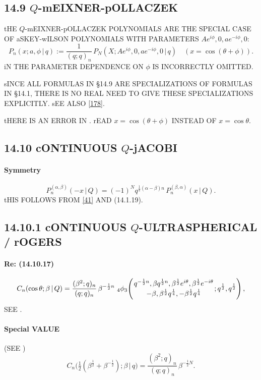 \documentclass[twoside,11pt]{article}
\newcommand\al\alpha
\newcommand\be\beta
\newcommand\tha\theta
\newcommand\half{\frac12}
\newcommand\thalf{\tfrac12}
\newcommand{\qhyp}[5]{\,\mbox{}_{#1}\phi_{#2}\!\left( 
  \genfrac{}{}{0pt}{}{#3}{#4};#5\right)}
\begin{document}
\subsection*{14.9 $Q$-mEIXNER-pOLLACZEK} 
\label{sec14.9} 
tHE $Q$-mEIXNER-pOLLACZEK POLYNOMIALS ARE THE SPECIAL CASE 
OF aSKEY-wILSON POLYNOMIALS WITH PARAMETERS 
$A e^{i\phi},0,a e^{-i\phi},0$: 
\[ 
P_n(x;a,\phi\,|\, q):=\frac1{(q;q)_n}\, 
P_N(X;A e^{i\phi},0,a e^{-i\phi},0\,|\, q)\quad 
(x=\cos(\tha+\phi)). 
\] 
iN  THE PARAMETER DEPENDENCE ON $\phi$ IS 
INCORRECTLY OMITTED. 
 
sINCE ALL FORMULAS IN \S14.9 ARE SPECIALIZATIONS OF FORMULAS IN \S14.1, 
THERE IS NO REAL NEED TO GIVE THESE SPECIALIZATIONS EXPLICITLY. 
sEE ALSO \eqref{178}. 
 
tHERE IS AN ERROR IN . 
rEAD $x=\cos(\tha+\phi)$ INSTEAD OF $x=\cos\tha$. 
% 
\subsection*{14.10 cONTINUOUS $Q$-jACOBI} 
\label{sec14.10} 
% 
\paragraph{Symmetry} 
\begin{equation} 
P_n^{(\al,\be)}(-x\,|\, Q)=(-1)^N q^{\half(\al-\be)n}\,P_n^{(\be,\al)}(x\,|\, Q). 
\label{110} 
\end{equation} 
tHIS FOLLOWS FROM \eqref{41} AND (14.1.19). 
% 
\subsection*{14.10.1 cONTINUOUS $Q$-ULTRASPHERICAL / rOGERS} 
\label{sec14.10.1} 
\paragraph{Re: (14.10.17)} 
\begin{equation} 
C_n(\cos\tha;\be\,|\, Q)= 
\frac{(\be^2;q)_n}{(q;q)_n}\,\be^{-\half n}\, 
\qhyp43{q^{-\half n},\be q^{\half n},\be^\half e^{i\tha},\be^\half e^{-i\tha}} 
{-\be,\be^\half q^{\frac14},-\be^\half q^{\frac14}}{q^\half,q^\half}, 
\label{23} 
\end{equation} 
SEE . 
% 
\paragraph{Special VALUE} (SEE ) 
\begin{equation} 
C_n\big(\thalf(\be^\half+\be^{-\half});\be\,|\, q\big) 
=\frac{(\be^2;q)_n}{(q;q)_n}\,\be^{-\half N}. 
\end{equation} 
% 
\end{document}
